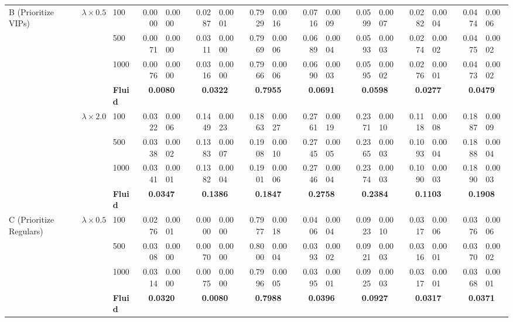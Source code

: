 \begin{table}[htbp]
\begin{threeparttable}
{\begin{tabular}{l|l|l|r@{\,$\pm$\,}l|r@{\,$\pm$\,}l|r@{\,$\pm$\,}l|r@{\,$\pm$\,}l|r@{\,$\pm$\,}l|r@{\,$\pm$\,}l|r@{\,$\pm$\,}l}
\hline
\multirow{8}{*}{B (Prioritize VIPs)} & \multirow{4}{*}{$\lambda \times 0.5$} & 100 & 0.0000 & 0.0000 & 0.0287 & 0.0001 & 0.7929 & 0.0016 & 0.0716 & 0.0009 & 0.0599 & 0.0007 & 0.0282 & 0.0004 & 0.0474 & 0.0006 \\ 
 & & 500 & 0.0071 & 0.0000 & 0.0311 & 0.0000 & 0.7969 & 0.0006 & 0.0689 & 0.0004 & 0.0593 & 0.0003 & 0.0274 & 0.0002 & 0.0475 & 0.0002 \\ 
 & & 1000 & 0.0076 & 0.0000 & 0.0316 & 0.0000 & 0.7966 & 0.0006 & 0.0690 & 0.0003 & 0.0595 & 0.0002 & 0.0276 & 0.0001 & 0.0473 & 0.0002 \\ 
 & & \textbf{Fluid} & \multicolumn{2}{c|}{\textbf{0.0080}} & \multicolumn{2}{c|}{\textbf{0.0322}} & \multicolumn{2}{c|}{\textbf{0.7955}} & \multicolumn{2}{c|}{\textbf{0.0691}} & \multicolumn{2}{c|}{\textbf{0.0598}} & \multicolumn{2}{c|}{\textbf{0.0277}} & \multicolumn{2}{c}{\textbf{0.0479}} \\ 
\cline{2-17}
 & \multirow{4}{*}{$\lambda \times 2.0$} & 100 & 0.0322 & 0.0006 & 0.1449 & 0.0023 & 0.1863 & 0.0027 & 0.2761 & 0.0019 & 0.2371 & 0.0010 & 0.1118 & 0.0008 & 0.1887 & 0.0009 \\ 
 & & 500 & 0.0338 & 0.0002 & 0.1383 & 0.0007 & 0.1908 & 0.0010 & 0.2745 & 0.0005 & 0.2365 & 0.0003 & 0.1093 & 0.0004 & 0.1888 & 0.0004 \\ 
 & & 1000 & 0.0341 & 0.0001 & 0.1382 & 0.0004 & 0.1901 & 0.0006 & 0.2746 & 0.0004 & 0.2374 & 0.0003 & 0.1090 & 0.0003 & 0.1890 & 0.0003 \\ 
 & & \textbf{Fluid} & \multicolumn{2}{c|}{\textbf{0.0347}} & \multicolumn{2}{c|}{\textbf{0.1386}} & \multicolumn{2}{c|}{\textbf{0.1847}} & \multicolumn{2}{c|}{\textbf{0.2758}} & \multicolumn{2}{c|}{\textbf{0.2384}} & \multicolumn{2}{c|}{\textbf{0.1103}} & \multicolumn{2}{c}{\textbf{0.1908}} \\ 
\hline
\multirow{8}{*}{C (Prioritize Regulars)} & \multirow{4}{*}{$\lambda \times 0.5$} & 100 & 0.0276 & 0.0001 & 0.0000 & 0.0000 & 0.7977 & 0.0018 & 0.0406 & 0.0004 & 0.0923 & 0.0010 & 0.0317 & 0.0006 & 0.0376 & 0.0006 \\ 
 & & 500 & 0.0308 & 0.0000 & 0.0070 & 0.0000 & 0.8000 & 0.0004 & 0.0393 & 0.0002 & 0.0921 & 0.0003 & 0.0316 & 0.0001 & 0.0370 & 0.0002 \\ 
 & & 1000 & 0.0314 & 0.0000 & 0.0075 & 0.0000 & 0.7996 & 0.0005 & 0.0395 & 0.0001 & 0.0925 & 0.0003 & 0.0317 & 0.0001 & 0.0368 & 0.0001 \\ 
 & & \textbf{Fluid} & \multicolumn{2}{c|}{\textbf{0.0320}} & \multicolumn{2}{c|}{\textbf{0.0080}} & \multicolumn{2}{c|}{\textbf{0.7988}} & \multicolumn{2}{c|}{\textbf{0.0396}} & \multicolumn{2}{c|}{\textbf{0.0927}} & \multicolumn{2}{c|}{\textbf{0.0317}} & \multicolumn{2}{c}{\textbf{0.0371}} \\ 

\end{tabular}}
\end{threeparttable}
\end{table}
